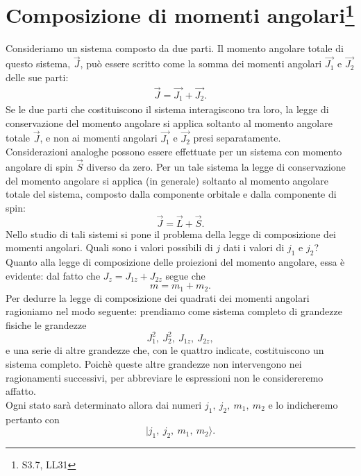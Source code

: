 \chapter[Composizione di momenti angolari]{Composizione di momenti angolari\footnote{S3.7, LL31}}
Consideriamo un sistema composto da due parti. Il momento angolare totale di questo sistema, $\vec{J}$, può essere scritto come la somma dei momenti angolari $\vec{J_1}$ e $\vec{J_2}$ delle sue parti:
\begin{align} \label{eq:cap19_01}
\vec{J} = \vec{J_1} + \vec{J_2}.
\end{align}
Se le due parti che costituiscono il sistema interagiscono tra loro, la legge di conservazione del momento angolare si applica soltanto al momento angolare totale $\vec{J}$, e non ai momenti angolari $\vec{J_1}$ e $\vec{J_2}$ presi separatamente.\\
Considerazioni analoghe possono essere effettuate per un sistema con momento angolare di spin $\vec{S}$ diverso da zero. Per un tale sistema la legge di conservazione del momento angolare si applica (in generale) soltanto al momento angolare totale del sistema, composto dalla componente orbitale e dalla componente di spin:
\begin{equation}
\vec{J} = \vec{L} + \vec{S}.
\end{equation}
Nello studio di tali sistemi si pone il problema della legge di composizione dei momenti angolari. Quali sono i valori possibili di $j$ dati i valori di $j_1$ e $j_2$? \\
Quanto alla legge di composizione delle proiezioni del momento angolare, essa è evidente: dal fatto che $J_z = J_{1z} + J_{2z}$ segue che 
\begin{equation} \label{eq:cap19_02}
m= m_1 + m_2.
\end{equation}
Per dedurre la legge di composizione dei quadrati dei momenti angolari ragioniamo nel modo seguente: prendiamo come sistema completo di grandezze fisiche le grandezze
\begin{equation}
J_1^2 ,~ J_2^2 ,~ J_{1z} ,~ J_{2z} ,
\end{equation}
e una serie di altre grandezze che, con le quattro indicate, costituiscono un sistema completo. Poichè queste altre grandezze non intervengono nei ragionamenti successivi, per abbreviare le espressioni non le considereremo affatto.\\
Ogni stato sarà determinato allora dai numeri $j_1 , ~ j_2 ,~ m_1 , ~ m_2$ e lo indicheremo pertanto con
\begin{equation}
| j_1 , ~ j_2 ,~ m_1 ,~ m_2 \rangle .
\end{equation}
